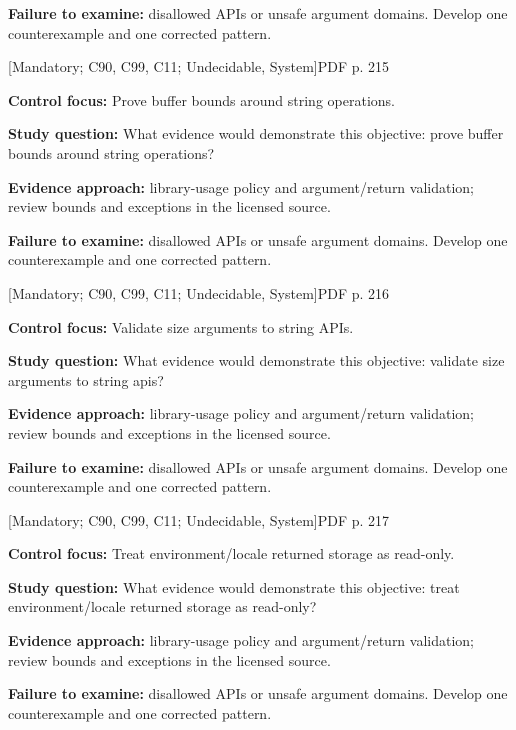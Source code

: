 \documentclass[10pt,letterpaper]{article}
\begin{document}
\textbf{Failure to examine:} disallowed APIs or unsafe argument domains. Develop one counterexample and one corrected pattern.\par
\smallskip
{}
 \textsf{\footnotesize [Mandatory; C90, C99, C11; Undecidable, System]}\hfill{\footnotesize PDF p. 215}\par
\textbf{Control focus:} Prove buffer bounds around string operations.\par
\textbf{Study question:} What evidence would demonstrate this objective: prove buffer bounds around string operations?\par
\textbf{Evidence approach:} library-usage policy and argument/return validation; review bounds and exceptions in the licensed source.\par
\textbf{Failure to examine:} disallowed APIs or unsafe argument domains. Develop one counterexample and one corrected pattern.\par
\smallskip
{}
 \textsf{\footnotesize [Mandatory; C90, C99, C11; Undecidable, System]}\hfill{\footnotesize PDF p. 216}\par
\textbf{Control focus:} Validate size arguments to string APIs.\par
\textbf{Study question:} What evidence would demonstrate this objective: validate size arguments to string apis?\par
\textbf{Evidence approach:} library-usage policy and argument/return validation; review bounds and exceptions in the licensed source.\par
\textbf{Failure to examine:} disallowed APIs or unsafe argument domains. Develop one counterexample and one corrected pattern.\par
\smallskip
{}
 \textsf{\footnotesize [Mandatory; C90, C99, C11; Undecidable, System]}\hfill{\footnotesize PDF p. 217}\par
\textbf{Control focus:} Treat environment/locale returned storage as read-only.\par
\textbf{Study question:} What evidence would demonstrate this objective: treat environment/locale returned storage as read-only?\par
\textbf{Evidence approach:} library-usage policy and argument/return validation; review bounds and exceptions in the licensed source.\par
\textbf{Failure to examine:} disallowed APIs or unsafe argument domains. Develop one counterexample and one corrected pattern.\par
\end{document}
